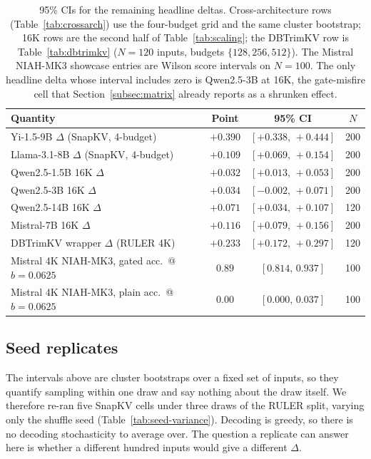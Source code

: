 \begin{table}[t]
\centering
\caption{95\% CIs for the remaining headline deltas. Cross-architecture rows
(Table~\ref{tab:crossarch}) use the four-budget grid and the same cluster
bootstrap; 16K rows are the second half of Table~\ref{tab:scaling}; the
DBTrimKV row is Table~\ref{tab:dbtrimkv} ($N = 120$ inputs, budgets
$\{128, 256, 512\}$). The Mistral NIAH-MK3 showcase entries are Wilson
score intervals on $N = 100$. The only headline delta whose interval
includes zero is Qwen2.5-3B at 16K, the gate-misfire cell that
Section~\ref{subsec:matrix} already reports as a shrunken effect.}
\label{tab:other-ci}
\begin{tabular}{lccc}
\toprule
Quantity & Point & 95\% CI & $N$ \\
\midrule
Yi-1.5-9B $\Delta$ (SnapKV, 4-budget)      & $+0.390$ & $[+0.338,\,+0.444]$ & 200 \\
Llama-3.1-8B $\Delta$ (SnapKV, 4-budget)   & $+0.109$ & $[+0.069,\,+0.154]$ & 200 \\
\midrule
Qwen2.5-1.5B 16K $\Delta$                  & $+0.032$ & $[+0.013,\,+0.053]$ & 200 \\
Qwen2.5-3B 16K $\Delta$                    & $+0.034$ & $[-0.002,\,+0.071]$ & 200 \\
Qwen2.5-14B 16K $\Delta$                   & $+0.071$ & $[+0.034,\,+0.107]$ & 120 \\
Mistral-7B 16K $\Delta$                    & $+0.116$ & $[+0.079,\,+0.156]$ & 200 \\
\midrule
DBTrimKV wrapper $\Delta$ (RULER 4K)       & $+0.233$ & $[+0.172,\,+0.297]$ & 120 \\
\midrule
Mistral 4K NIAH-MK3, gated acc.\ @ $b{=}0.0625$ & $0.89$ & $[0.814,\,0.937]$ & 100 \\
Mistral 4K NIAH-MK3, plain acc.\ @ $b{=}0.0625$ & $0.00$ & $[0.000,\,0.037]$ & 100 \\
\bottomrule
\end{tabular}
\end{table}

\subsection{Seed replicates}
\label{subsec:seed-variance}

The intervals above are cluster bootstraps over a fixed set of inputs, so they
quantify sampling within one draw and say nothing about the draw itself. We
therefore re-ran five SnapKV cells under three draws of the RULER split, varying
only the shuffle seed (Table~\ref{tab:seed-variance}). Decoding is greedy, so
there is no decoding stochasticity to average over. The question a replicate can
answer here is whether a different hundred inputs would give a different
$\Delta$.


